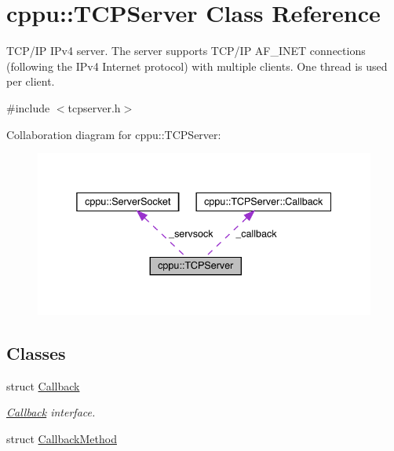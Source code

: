 \hypertarget{classcppu_1_1_t_c_p_server}{}\section{cppu\+::T\+C\+P\+Server Class Reference}
\label{classcppu_1_1_t_c_p_server}


T\+C\+P/\+IP I\+Pv4 server. The server supports T\+C\+P/\+IP A\+F\+\_\+\+I\+N\+ET connections (following the I\+Pv4 Internet protocol) with multiple clients. One thread is used per client.  




{\ttfamily \#include $<$tcpserver.\+h$>$}



Collaboration diagram for cppu\+::T\+C\+P\+Server\+:
\nopagebreak
\begin{figure}[H]
\begin{center}
\leavevmode
\includegraphics[width=338pt]{classcppu_1_1_t_c_p_server__coll__graph}
\end{center}
\end{figure}
\subsection*{Classes}
\begin{DoxyCompactItemize}
\item 
struct \mbox{\hyperlink{structcppu_1_1_t_c_p_server_1_1_callback}{Callback}}
\begin{DoxyCompactList}\small\item\em \mbox{\hyperlink{structcppu_1_1_t_c_p_server_1_1_callback}{Callback}} interface. \end{DoxyCompactList}\item 
struct \mbox{\hyperlink{structcppu_1_1_t_c_p_server_1_1_callback_method}{Callback\+Method}}
\end{DoxyCompactItemize}
